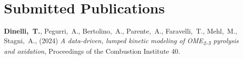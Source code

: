 \newif\ifshowpubsummary
\newif\ifshowsubmittedpubs
\showsubmittedpubstrue %
\newif\ifshowacceptedpubs

\newcommand{\arxiv}[1]{[\href{http://arxiv.org/abs/#1}{arXiv:#1}]}

\def\zero{0}
\def\one{1}
\newcommand{\citeCount}[1]{%
  \def\val{#1}
  \ifx\val\zero%
  \else%
    \ifx\val\one%
    (1~citation)%
    \else%
    (#1~citations)%
    \fi%
  \fi}

\setcounter{numPubs}{4}

\setcounter{pubCounter}{\value{numPubs}}


\ifshowpubsummary
\section{\sc Publication Summary}
   {\bf h-index ---}
   As of 20-02-2024: 1 (according to Google Scholar).

   {\bf Top five cited ---}
\else %
\fi

\renewcommand{\citeCount}[1]{}
\ifshowsubmittedpubs
\section{\sc Submitted Publications}
   \begin{etaremune}[start=\value{pubCounter}]
      \item
         {\bf Dinelli,~T.},
         Pegurri,~A.,
         Bertolino,~A.,
         Parente,~A.,
         Faravelli,~T.,
         Mehl,~M.,
         Stagni,~A.,
         (2024)
         {\it A data-driven, lumped kinetic modeling of OME\textsubscript{2-5} pyrolysis and oxidation},
         {Proceedings of the Combustion Institute 40}.
   \end{etaremune}
\else %
\fi

